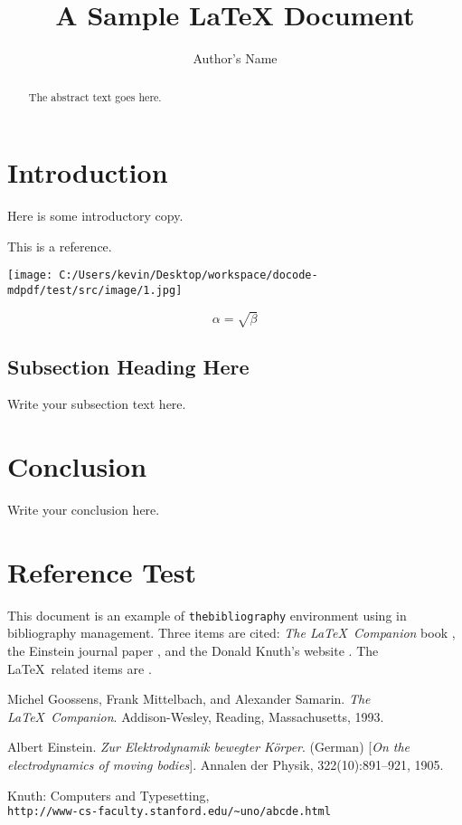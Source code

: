 \documentclass{article}
\begin{document}
\title{A Sample \LaTeX{} Document}
\author{Author's Name}

\maketitle

\begin{abstract}
The abstract text goes here.
\end{abstract}

\section{Introduction}
Here is some introductory copy.

This is a reference\cite{einstein}.


\texttt{[image: C:/Users/kevin/Desktop/workspace/docode-mdpdf/test/src/image/1.jpg]}

\iffalse
\texttt{[image: 1.png]}
\fi

\begin{equation}
    \label{simple_equation}
    \alpha = \sqrt{ \beta }
\end{equation}

\subsection{Subsection Heading Here}
Write your subsection text here.

\section{Conclusion}
Write your conclusion here.

\section{Reference Test}
 
This document is an example of \texttt{thebibliography} environment using 
in bibliography management. Three items are cited: \textit{The \LaTeX\ Companion} 
book \cite{latexcompanion}, the Einstein journal paper \cite{einstein}, and the 
Donald Knuth's website \cite{knuthwebsite}. The \LaTeX\ related items are
\cite{latexcompanion,knuthwebsite}. 
 
\medskip
 
\begin{thebibliography}{9}
Michel Goossens, Frank Mittelbach, and Alexander Samarin. 
\textit{The \LaTeX\ Companion}. 
Addison-Wesley, Reading, Massachusetts, 1993.
 
Albert Einstein. 
\textit{Zur Elektrodynamik bewegter K{\"o}rper}. (German) 
[\textit{On the electrodynamics of moving bodies}]. 
Annalen der Physik, 322(10):891–921, 1905.
 
Knuth: Computers and Typesetting,
\\\texttt{http://www-cs-faculty.stanford.edu/\~{}uno/abcde.html}
\end{thebibliography}
\end{document}
